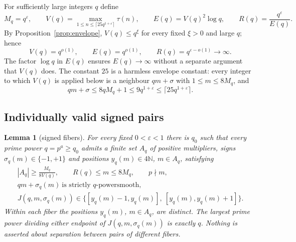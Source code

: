 \documentclass[11pt,letterpaper]{article}
\numberwithin{equation}{section}
\theoremstyle{plain}
\newtheorem{lemma}{Lemma}
\theoremstyle{remark}
\newcommand{\N}{\mathbb N}
\begin{document}
For sufficiently large integers $q$ define
\begin{equation}\label{eq:envelope}
M_q=q^\varepsilon,\qquad
V(q)=\max_{1\le n\le\lceil25q^{1+\varepsilon}\rceil}\tau(n),\qquad
E(q)=V(q)^2\log q,\qquad
R(q)=\frac{q^\varepsilon}{E(q)} .
\end{equation}
By Proposition~\ref{prop:envelope}, $V(q)\le q^{\xi}$ for every fixed $\xi>0$ and large $q$; hence
\begin{equation}\label{eq:envelopesize}
V(q)=q^{o(1)},\qquad E(q)=q^{o(1)},\qquad R(q)=q^{\varepsilon-o(1)}\longrightarrow\infty .
\end{equation}
The factor $\log q$ in $E(q)$ ensures $E(q)\to\infty$ without a separate argument that $V(q)$ does. The constant $25$ is a harmless envelope constant: every integer to which $V(q)$ is applied below is a neighbour $qm+\sigma$ with $1\le m\le8M_q$, and
\begin{equation}\label{eq:envelopecontain}
qm+\sigma\le8qM_q+1\le9q^{1+\varepsilon}\le\lceil25q^{1+\varepsilon}\rceil .
\end{equation}

\subsection{Individually valid signed pairs}\label{sec:fiberconstr}

\begin{lemma}[signed fibers]\label{lem:fiber}
For every fixed $0<\varepsilon<1$ there is $q_0$ such that every prime power $q=p^a\ge q_0$ admits a finite set $A_q$ of positive multipliers, signs $\sigma_q(m)\in\{-1,+1\}$ and positions $y_q(m)\in4\N$, $m\in A_q$, satisfying
\begin{gather}
|A_q|\ge\frac{M_q}{8V(q)},\qquad R(q)\le m\le8M_q,\qquad p\nmid m,\label{eq:S2}\\
qm+\sigma_q(m)\ \text{is strictly $q$-powersmooth},\label{eq:S3}\\
J(q,m,\sigma_q(m))\in\bigl\{[y_q(m)-1,y_q(m)],\ [y_q(m),y_q(m)+1]\bigr\}.\label{eq:S4}
\end{gather}
Within each fiber the positions $y_q(m)$, $m\in A_q$, are distinct. The largest prime power dividing either endpoint of $J(q,m,\sigma_q(m))$ is exactly $q$. Nothing is asserted about separation between pairs of different fibers.
\end{lemma}
\end{document}
